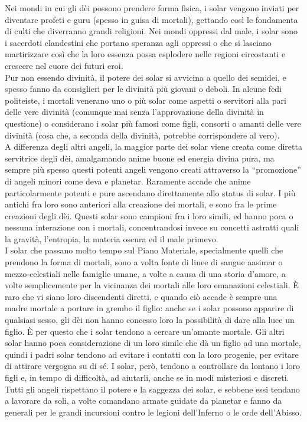 \begin{multicols}{2}
Nei mondi in cui gli dèi possono prendere forma fisica, i solar vengono inviati per diventare profeti e guru (spesso in guisa di mortali), gettando così le fondamenta di culti che diverranno grandi religioni. Nei mondi oppressi dal male, i solar sono i sacerdoti clandestini che portano speranza agli oppressi o che si lasciano martirizzare così che la loro essenza possa esplodere nelle regioni circostanti e crescere nel cuore dei futuri eroi.\\
Pur non essendo divinità, il potere dei solar si avvicina a quello dei semidei, e spesso fanno da consiglieri per le divinità più giovani o deboli. In alcune fedi politeiste, i mortali venerano uno o più solar come aspetti o servitori alla pari delle vere divinità (comunque mai senza l'approvazione della divinità in questione) o considerano i solar più famosi come figli, consorti o amanti delle vere divinità (cosa che, a seconda della divinità, potrebbe corrispondere al vero).\\
A differenza degli altri angeli, la maggior parte dei solar viene creata come diretta servitrice degli dèi, amalgamando anime buone ed energia divina pura, ma sempre più spesso questi potenti angeli vengono creati attraverso la “promozione” di angeli minori come deva e planetar. Raramente accade che anime particolarmente potenti e pure ascendano direttamente allo status di solar. I più antichi fra loro sono anteriori alla creazione dei mortali, e sono fra le prime creazioni degli dèi. Questi solar sono campioni fra i loro simili, ed hanno poca o nessuna interazione con i mortali, concentrandosi invece su concetti astratti quali la gravità, l'entropia, la materia oscura ed il male primevo.\\
I solar che passano molto tempo sul Piano Materiale, specialmente quelli che prendono la forma di mortali, sono a volta fonte di linee di sangue aasimar o mezzo-celestiali nelle famiglie umane, a volte a causa di una storia d'amore, a volte semplicemente per la vicinanza dei mortali alle loro emanazioni celestiali. È raro che vi siano loro discendenti diretti, e quando ciò accade è sempre una madre mortale a portare in grembo il figlio: anche se i solar possono apparire di qualsiasi sesso, gli dèi non hanno concesso loro la possibilità di dare alla luce un figlio. È per questo che i solar tendono a cercare un'amante mortale. Gli altri solar hanno poca considerazione di un loro simile che dà un figlio ad una mortale, quindi i padri solar tendono ad evitare i contatti con la loro progenie, per evitare di attirare vergogna su di sé. I solar, però, tendono a controllare da lontano i loro figli e, in tempo di difficoltà, ad aiutarli, anche se in modi misteriosi e discreti.\\
Tutti gli angeli rispettano il potere e la saggezza dei solar, e sebbene essi tendano a lavorare da soli, a volte comandano armate guidate da planetar e fanno da generali per le grandi incursioni contro le legioni dell'Inferno o le orde dell'Abisso.\\


\end{multicols}
